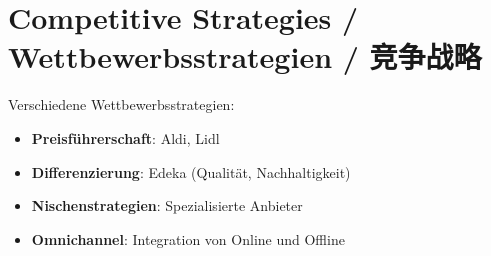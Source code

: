 \section{Competitive Strategies / Wettbewerbsstrategien / 竞争战略}

\begin{otherlanguage}{ngerman}
Verschiedene Wettbewerbsstrategien:
\begin{itemize}
    \item \textbf{Preisführerschaft}: Aldi, Lidl
    \item \textbf{Differenzierung}: Edeka (Qualität, Nachhaltigkeit)
    \item \textbf{Nischenstrategien}: Spezialisierte Anbieter
    \item \textbf{Omnichannel}: Integration von Online und Offline
\end{itemize}
\end{otherlanguage}


